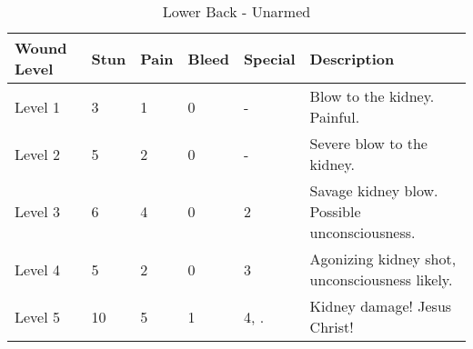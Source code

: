 \documentclass[oneside,11pt,english]{book}
\begin{document}
\begin{table}[!hb] %
	\caption{Lower Back - Unarmed}
	\label{wound:Lower Back - Unarmed}
	\begin{tabu} to 
Wound Level& Stun&Pain&Bleed&Special&Description\\\toprule\toprule
Level 1 &3 &1 &0 &- &Blow to the kidney. Painful.\\
Level 2 &5 &2 &0 &- &Severe blow to the kidney.\\
Level 3 &6 &4 &0 &  2&Savage kidney blow. Possible unconsciousness.\\
Level 4 &5 &2 &0 &  3&Agonizing kidney shot, unconsciousness likely.\\
Level 5 &10 &5 &1 
	& 4, \newline
		.
	&Kidney damage! Jesus Christ!\\
	\end{tabu}
\end{table}
\end{document}
